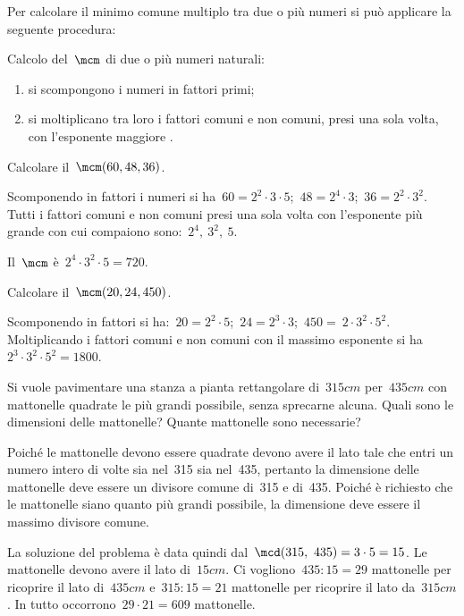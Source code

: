 Per calcolare il minimo comune multiplo tra due o più numeri si può 
applicare la seguente procedura:

\begin{procedura}
Calcolo del~\(\mcm\) di due o più numeri naturali:
\begin{enumerate}[noitemsep, label=(\alph*)]
 \item si scompongono i numeri in fattori primi;
 \item si moltiplicano tra loro i fattori comuni e non comuni, 
  presi una sola volta, con l'esponente maggiore .
\end{enumerate}
\end{procedura}


 \begin{esempio}
 Calcolare il~\(\mcm(60,48,36)\).

Scomponendo in fattori i numeri si 
ha~\(60=2^2\cdot3\cdot5\);~\(48=2^4\cdot3\);~\(36 =2^2\cdot3^2\).
Tutti i fattori comuni e non comuni presi una sola volta con l'esponente 
più grande con cui compaiono sono:~\(2^4,~3^2,~5\).

Il~\(\mcm\) è~\(2^4\cdot3^2\cdot5=720\).
 \end{esempio}

 \begin{esempio}
 Calcolare il~\(\mcm(20,24,450)\).

Scomponendo in fattori si 
ha:~\(20=2^2\cdot5\);~\(24=2^3\cdot3\);~\(450 =~2\cdot3^2\cdot5^2\).
Moltiplicando i fattori comuni e non comuni con il massimo esponente 
si ha~\(2^3\cdot3^2\cdot5^2=1800\).
 \end{esempio}

 \begin{esempio}
 Si vuole pavimentare una stanza a pianta rettangolare di~\(315\unit{cm}\) 
 per~\(435\unit{cm}\) con mattonelle quadrate le più grandi possibile, 
 senza sprecarne alcuna. Quali sono le dimensioni delle 
 mattonelle? Quante mattonelle sono necessarie?

Poiché le mattonelle devono essere quadrate devono avere il lato tale che 
entri un numero intero di volte sia nel~315 sia nel~435, pertanto la 
dimensione delle mattonelle deve essere un divisore comune
di~315 e di~435. Poiché è richiesto che le mattonelle siano quanto più 
grandi possibile, la dimensione deve essere il massimo divisore comune.
\begin{center}
 
% 
\end{center}
La soluzione del problema è data quindi dal~\(\mcd(315,~435)=3 \cdot 5=15\). 
Le mattonelle devono avere il lato di~\(15\unit{cm}\).
Ci vogliono~\(435:15=29\) mattonelle per ricoprire il lato 
di~\(435\unit{cm}\) e~\(315:15=21\) mattonelle per ricoprire il lato
da~\(315\unit{cm}\). In tutto occorrono~\(29\cdot21=609\) mattonelle.
\end{esempio}

